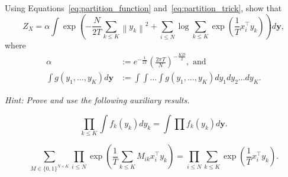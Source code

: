 \begin{exercise}
Using Equations~\ref{eq:partition_function} and~\ref{eq:partition_trick}, show that
%
\begin{equation}
Z_X = \alpha \int\exp\left(-\frac{N}{2T}\sum_{k \leq K} \left\|y_k\right\|^2 + \sum_{i \leq N} \log \sum_{k \leq K} \exp\left(\frac{1}{T}x_i^\top y_k\right)\right)d\mathbf{y},
\end{equation}
%
where
%
\begin{align}
\alpha &:= e^{-\frac{1}{2T}}\left(\frac{2\pi T}{N}\right)^{-\frac{KD}{2}}, \text{ and}\\
\int g(y_1, \ldots, y_K)d\mathbf{y} &:= \int \int \ldots \int g(y_1, \ldots, y_K) dy_1 dy_2\ldots dy_K.
\end{align}

\textit{Hint: Prove and use the following auxiliary results.}

$$\prod_{k \leq K} \int f_k(y_k) dy_k = \int \prod f_k(y_k) d\mathbf{y}.$$

$$\sum_{M \in \{0, 1\}^{N \times K}}\prod_{i \leq N}\exp\left(\frac{1}{T}\sum_{k \leq K}M_{ik}x_i^\top y_k\right) = \prod_{i \leq N}\sum_{k \leq K}\exp\left(\frac{1}{T}x_i^\top y_k\right).$$
\end{exercise}

